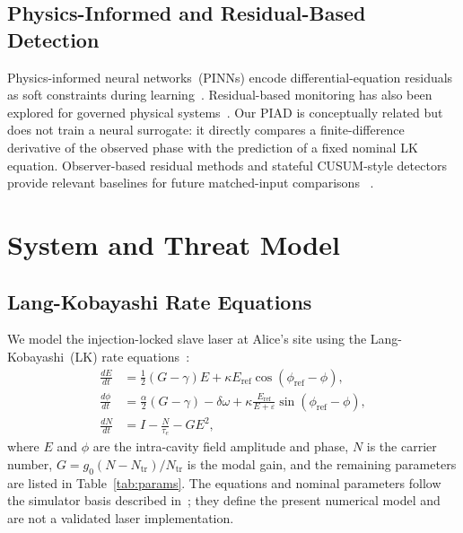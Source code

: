 \documentclass[journal,twocolumn]{IEEEtran}
\newcommand{\Eref}{E_{\mathrm{ref}}}
\newcommand{\phiref}{\phi_{\mathrm{ref}}}
\newcommand{\Ntr}{N_{\mathrm{tr}}}
\newcommand{\taue}{\tau_{e}}
\newcommand{\kap}{\kappa}
\newcommand{\gam}{\gamma}
\newcommand{\dOmega}{\delta\omega}
\begin{document}
\subsection{Physics-Informed and Residual-Based Detection}

Physics-informed neural networks~(PINNs) encode differential-equation residuals as
soft constraints during learning~\cite{raissi2019}. Residual-based monitoring has
also been explored for governed physical systems~\cite{cai2021,ritto2021}. Our PIAD
is conceptually related but does not train a neural surrogate: it directly compares a
finite-difference derivative of the observed phase with the prediction of a fixed
nominal LK equation. Observer-based residual methods and stateful CUSUM-style
detectors provide relevant baselines for future matched-input comparisons
~\cite{chowdhury2020,urbina2016}.

\section{System and Threat Model}
\label{sec:model}

\subsection{Lang-Kobayashi Rate Equations}

We model the injection-locked slave laser at Alice's site using the
Lang-Kobayashi~(LK) rate equations~\cite{lang1980}:
\begin{align}
  \frac{dE}{dt}   &= \tfrac{1}{2}(G-\gam)E + \kap\Eref\cos(\phiref - \phi), \label{eq:E} \\
  \frac{d\phi}{dt} &= \frac{\alpha}{2}(G-\gam) - \dOmega
                      + \kap\frac{\Eref}{E+\varepsilon}\sin(\phiref - \phi), \label{eq:phi} \\
  \frac{dN}{dt}   &= I - \frac{N}{\taue} - GE^2, \label{eq:N}
\end{align}
where $E$ and $\phi$ are the intra-cavity field amplitude and phase, $N$ is the
carrier number, $G = g_0(N-\Ntr)/\Ntr$ is the modal gain, and the remaining
parameters are listed in Table~\ref{tab:params}. The equations and nominal
parameters follow the simulator basis described in~\cite{juarez2026,basepaper};
they define the present numerical model and are not a validated laser implementation.
\end{document}
